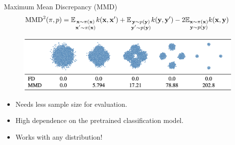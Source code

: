 \documentclass{beamer}
\begin{document}
\begin{frame}{Maximum Mean Discrepancy (MMD)}
		\vspace{-0.6cm}
		\[
			\text{MMD}^2(\pi, p) = \mathbb{E}_{\substack{\mathbf{x} \sim\pi(\mathbf{x}) \\ \mathbf{x}' \sim\pi(\mathbf{x})}} k(\mathbf{x}, \mathbf{x}') + \mathbb{E}_{\substack{\mathbf{y} \sim p(\mathbf{y}) \\ \mathbf{y}' \sim p(\mathbf{y})}} k(\mathbf{y}, \mathbf{y}') - 2 \mathbb{E}_{\substack{\mathbf{x} \sim\pi(\mathbf{x}) \\ \mathbf{y} \sim p(\mathbf{y})}} k(\mathbf{x}, \mathbf{y})
		\]
		\vspace{-0.3cm}
	\begin{figure}
		\includegraphics[width=0.95\linewidth]{figs/mmd_normal}
	\end{figure}
	\begin{itemize}
		\item Needs less sample size for evaluation.
		\item High dependence on the pretrained classification model.
		\item Works with any distribution!
	\end{itemize}
\end{frame}
\end{document}
